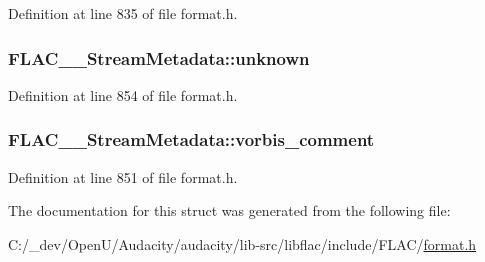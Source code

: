 Definition at line 835 of file format.\+h.

\subsubsection[{\texorpdfstring{unknown}{unknown}}]{ F\+L\+A\+C\+\_\+\+\_\+\+Stream\+Metadata\+::unknown}\hypertarget{struct_f_l_a_c_____stream_metadata_ac29528515ea884b108a813a6609515bd}{}\label{struct_f_l_a_c_____stream_metadata_ac29528515ea884b108a813a6609515bd}


Definition at line 854 of file format.\+h.

\subsubsection[{\texorpdfstring{vorbis\+\_\+comment}{vorbis_comment}}]{ F\+L\+A\+C\+\_\+\+\_\+\+Stream\+Metadata\+::vorbis\+\_\+comment}\hypertarget{struct_f_l_a_c_____stream_metadata_a02662cb0ff19e8229dcd2384f708bae0}{}\label{struct_f_l_a_c_____stream_metadata_a02662cb0ff19e8229dcd2384f708bae0}


Definition at line 851 of file format.\+h.



The documentation for this struct was generated from the following file\+:\begin{DoxyCompactItemize}
\item 
C\+:/\+\_\+dev/\+Open\+U/\+Audacity/audacity/lib-\/src/libflac/include/\+F\+L\+A\+C/\hyperlink{include_2_f_l_a_c_2format_8h}{format.\+h}\end{DoxyCompactItemize}
